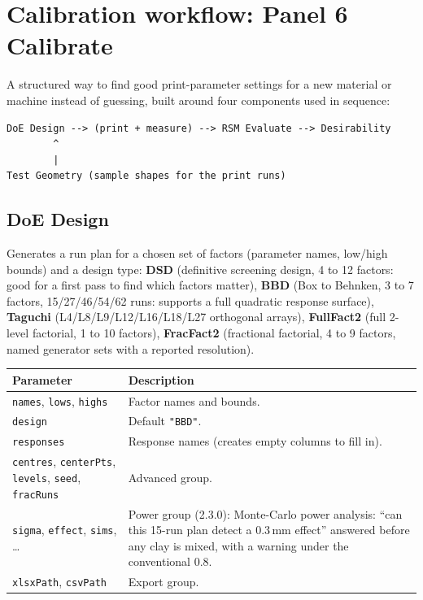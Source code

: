 \documentclass[11pt]{article}
\newcommand{\param}[1]{\texttt{#1}}
\begin{document}
\section{Calibration workflow: Panel 6 Calibrate}

A structured way to find good print-parameter settings for a new
material or machine instead of guessing, built around four components
used in sequence:

\begin{verbatim}
DoE Design --> (print + measure) --> RSM Evaluate --> Desirability
        ^
        |
Test Geometry (sample shapes for the print runs)
\end{verbatim}

\subsection{DoE Design}

Generates a run plan for a chosen set of factors (parameter names,
low/high bounds) and a design type: \textbf{DSD} (definitive screening
design, 4 to 12 factors: good for a first pass to find which factors
matter), \textbf{BBD} (Box to Behnken, 3 to 7 factors, 15/27/46/54/62 runs: supports a full quadratic response surface), \textbf{Taguchi}
(L4/L8/L9/L12/L16/L18/L27 orthogonal arrays), \textbf{FullFact2} (full
2-level factorial, 1 to 10 factors), \textbf{FracFact2} (fractional
factorial, 4 to 9 factors, named generator sets with a reported
resolution).

\begin{longtable}{@{}p{3.2cm}p{9.3cm}@{}}
\toprule
\textbf{Parameter} & \textbf{Description} \\
\midrule
\endhead
\param{names}, \param{lows}, \param{highs} & Factor names and bounds. \\
\param{design} & Default \texttt{"BBD"}. \\
\param{responses} & Response names (creates empty columns to fill in). \\
\param{centres}, \param{centerPts}, \param{levels}, \param{seed}, \param{fracRuns} & Advanced group. \\
\param{sigma}, \param{effect}, \param{sims}, \ldots & Power group (2.3.0): Monte-Carlo power analysis: ``can this 15-run plan detect a 0.3\,mm effect'' answered before any clay is mixed, with a warning under the conventional 0.8. \\
\param{xlsxPath}, \param{csvPath} & Export group. \\
\bottomrule
\end{longtable}
\end{document}
